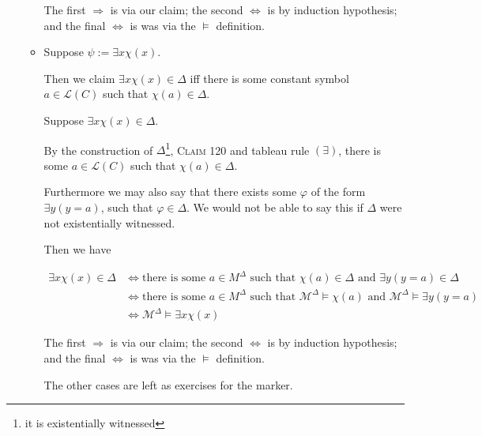 \documentclass[a4paper]{article}
\newcommand{\MODEL}{\mathcal{M}}
\newcommand{\LANGUAGE}{\mathcal{L}}
\begin{document}
\begin{enumerate}
\begin{itemize}
    The first $\Rightarrow$ is via our claim; the second $\Leftrightarrow$ is by induction hypothesis; and the final $\Leftrightarrow$ is was via the $\models$ definition.

    \item Suppose $\psi := \exists x \chi (x)$. 
    
        Then we claim $\exists x \chi (x) \in \Delta$ iff there is some constant symbol $a \in \LANGUAGE (C)$ such that $\chi(a) \in \Delta$.

        Suppose $\exists x \chi (x) \in \Delta$. 

        By the construction of $\Delta$\footnote{it is existentially witnessed}, \textsc{Claim 120} and tableau rule $(\exists)$, there is some $a \in \LANGUAGE(C)$ such that $\chi(a) \in \Delta$. 
        
        Furthermore we may also say that there exists some $\varphi$ of the form $\exists y(y = a)$, such that $\varphi \in \Delta$. We would not be able to say this if $\Delta$ were not existentially witnessed.

        Then we have

    \begin{align*}
        \exists x \chi (x)\in \Delta & \Leftrightarrow \text{there is some } a \in M^{\Delta} \text{ such that } \chi(a) \in \Delta \text{ and } \exists y(y = a) \in \Delta\\
        & \Leftrightarrow \text{there is some } a \in M^{\Delta} \text{ such that } \MODEL^{\Delta} \models \chi (a) \text{ and } \MODEL^{\Delta} \models \exists y(y = a)\\
        & \Leftrightarrow \MODEL^{\Delta} \models \exists x \chi (x)
    \end{align*}

    The first $\Rightarrow$ is via our claim; the second $\Leftrightarrow$ is by induction hypothesis; and the final $\Leftrightarrow$ is was via the $\models$ definition.

    The other cases are left as exercises for the marker.



\end{itemize}

\end{enumerate}
\end{document}
